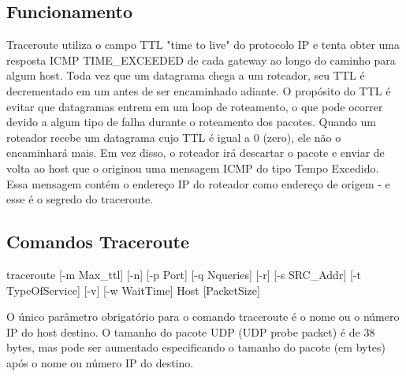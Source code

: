 \documentclass[
	article,			%
	11pt,				%
	oneside,			%
	a4paper,			%
	english,			%
	brazil,				%
	sumario=tradicional
	]{abntex2}
\begin{document}
\subsection{Funcionamento}
Traceroute utiliza o campo TTL "time to live" do protocolo IP e tenta obter uma resposta ICMP TIME\_EXCEEDED de cada gateway ao longo do caminho para algum host.
Toda vez que um datagrama chega a um roteador, seu TTL é decrementado em um antes de ser encaminhado adiante. O propósito do TTL é evitar que datagramas entrem em um loop de roteamento, o que pode ocorrer devido a algum tipo de falha durante o roteamento dos pacotes. Quando um roteador recebe um datagrama cujo TTL é igual a 0 (zero), ele não o encaminhará mais. Em vez disso, o roteador irá descartar o pacote e enviar de volta ao host que o originou uma mensagem ICMP do tipo Tempo Excedido. Essa mensagem contém o endereço IP do roteador como endereço de origem - e esse é o segredo do traceroute.\cite{boson}


\subsection{Comandos Traceroute}



traceroute [-m Max\_ttl] [-n] [-p Port] [-q Nqueries] [-r] [-s SRC\_Addr] [-t TypeOfService] [-v] [-w WaitTime] Host [PacketSize]

O único parâmetro obrigatório para o comando traceroute é o nome ou o número IP do host destino. O tamanho do pacote UDP (UDP probe packet) é de 38 bytes, mas pode ser aumentado especificando o tamanho do pacote (em bytes) após o nome ou número IP do destino.
\end{document}
